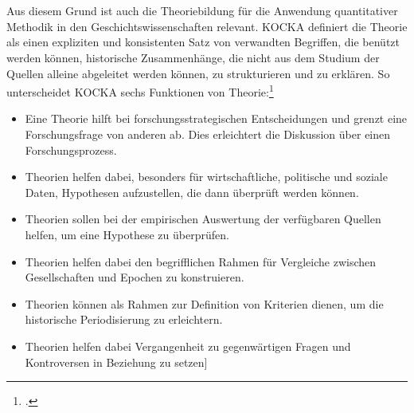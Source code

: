\documentclass[12pt,a4paper]{article}
\begin{document}
\\
\\
Aus diesem Grund ist auch die Theoriebildung für die Anwendung quantitativer Methodik in den Geschichtswissenschaften relevant. KOCKA definiert die Theorie als einen expliziten und konsistenten Satz von verwandten Begriffen, die benützt werden können, historische Zusammenhänge, die nicht aus dem Studium der Quellen alleine abgeleitet werden können, zu strukturieren und zu erklären. So unterscheidet KOCKA  sechs Funktionen von Theorie:\footcite[][S.10-14]{schroder1988historische}  
\begin{itemize}
\item Eine Theorie hilft bei forschungsstrategischen Entscheidungen und grenzt eine Forschungsfrage von anderen ab. Dies erleichtert die Diskussion über einen Forschungsprozess.
\item Theorien helfen dabei, besonders für wirtschaftliche, politische und soziale Daten, Hypothesen aufzustellen, die dann überprüft werden können.
\item Theorien sollen bei der empirischen Auswertung der verfügbaren Quellen helfen, um eine Hypothese zu überprüfen.
\item Theorien helfen dabei den begrifflichen Rahmen für Vergleiche zwischen Gesellschaften und Epochen zu konstruieren.
\item Theorien können als Rahmen zur Definition von Kriterien dienen, um die historische Periodisierung zu erleichtern.
\item  Theorien helfen dabei Vergangenheit zu gegenwärtigen Fragen und Kontroversen in Beziehung zu setzen]
\end{itemize}


\newpage
\end{document}

